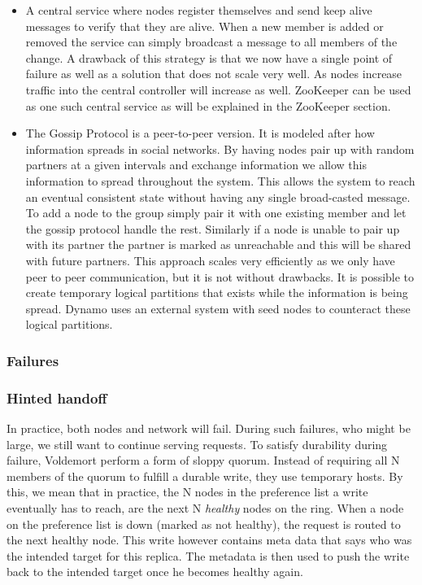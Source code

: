 \begin{itemize}
\item A central service where nodes register themselves and send keep alive messages to verify that they are alive. When a new member is added or removed the service can simply broadcast a message to all members of the change. A drawback of this strategy is that we now have a single point of failure as well as a solution that does not scale very well. As nodes increase traffic into the central controller will increase as well. ZooKeeper can be used as one such central service as will be explained in the ZooKeeper section.
\item The Gossip Protocol is a peer-to-peer version. It is modeled after how information spreads in social networks. By having nodes pair up with random partners at a given intervals and exchange information we allow this information to spread throughout the system. This allows the system to reach an eventual consistent state without having any single broad-casted message. To add a node to the group simply pair it with one existing member and let the gossip protocol handle the rest. Similarly if a node is unable to pair up with its partner the partner is marked as unreachable and this will be shared with future partners. This approach scales very efficiently as we only have peer to peer communication, but it is not without drawbacks. It is possible to create temporary logical partitions that exists while the information is being spread. Dynamo uses an external system with seed nodes to counteract these logical partitions. 

\end{itemize}





\subsubsection{Failures}

\subsubsection{Hinted handoff}
In practice, both nodes and network will fail. During such failures, who might be large, we still want to continue serving requests.
To satisfy durability during failure, Voldemort perform a form of sloppy quorum. 
Instead of requiring all N members of the quorum to fulfill a durable write, they use temporary hosts. 
By this, we mean that in practice, the N nodes in the preference list a write eventually has to reach, are the next N \emph{healthy} nodes on the ring.
When a node on the preference list is down (marked as not healthy), the request is routed to the next healthy node. 
This write however contains meta data that says who was the intended target for this replica. 
The metadata is then used to push the write back to the intended target once he becomes healthy again.

